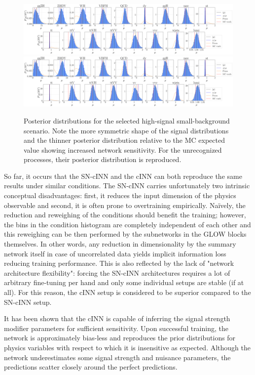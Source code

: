 \begin{figure}[h!]
	\centering
	\includegraphics[width=\linewidth]{figures/inference/194finalNoSummarye11000_posteriors}
	\includegraphics[width=\linewidth]{figures/inference/194finalSummary1Layer11000e300NodesCdim100_posteriors}
	\caption{Posterior distributions for the selected high-signal small-background scenario. Note the more symmetric shape of the signal distributions and the thinner posterior distribution relative to the MC expected value showing increased network sensitivity. For the unrecognized processes, their posterior distribution is reproduced.}
	\label{fig:HS-SM}
\end{figure}

So far, it occurs that the SN-cINN and the cINN can both reproduce the same results under similar conditions. The SN-cINN carries unfortunately two intrinsic conceptual disadvantages: first, it reduces the input dimension of the physics observable and second, it is often prone to overtraining empirically. Naïvely, the reduction and reweighing of the conditions should benefit the training; however, the bins in the condition histogram are completely independent of each other and this reweighing can be then performed by the subnetworks in the GLOW blocks themselves. In other words, any reduction in dimensionality by the summary network itself in case of uncorrelated data yields implicit information loss reducing training performance. This is also reflected by the lack of "network architecture flexibility": forcing the SN-cINN architectures requires a lot of arbitrary fine-tuning per hand and only some individual setups are stable (if at all). For this reason, the cINN setup is considered to be superior compared to the SN-cINN setup.


It has been shown that the cINN is capable of inferring the signal strength modifier parameters for sufficient sensitivity. Upon successful training, the network is approximately bias-less and reproduces the prior distributions for physics variables with respect to which it is insensitive as expected. Although the network underestimates some signal strength and nuisance parameters, the predictions scatter closely around the perfect predictions.